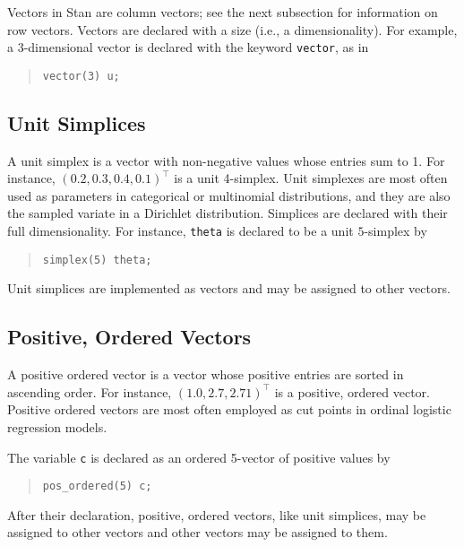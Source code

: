 \documentclass[10pt]{report}
\newcommand{\Stan}{Stan\xspace}
\newcommand{\code}[1]{{\tt #1}}
\begin{document}
Vectors in \Stan are column vectors; see the next subsection for
information on row vectors.  Vectors are declared with a size (i.e., a
dimensionality).  For example, a 3-dimensional vector is declared with
the keyword \code{vector}, as in 
%
\begin{quote}
\begin{Verbatim}
vector(3) u;
\end{Verbatim}
\end{quote}
%

\subsection{Unit Simplices}

A unit simplex is a vector with non-negative values whose entries sum
to 1.  For instance, $(0.2,0.3,0.4,0.1)^{\top}$ is a unit 4-simplex.
Unit simplexes are most often used as parameters in categorical
or multinomial distributions, and they are also the sampled variate in
a Dirichlet distribution.  Simplices are declared with their full
dimensionality.  For instance, \code{theta} is declared to
be a unit $5$-simplex by
%
\begin{quote}
\begin{Verbatim} 
simplex(5) theta;
\end{Verbatim}
\end{quote}
% 

Unit simplices are implemented as vectors and may be assigned to other
vectors.  


\subsection{Positive, Ordered Vectors}

A positive ordered vector is a vector whose positive entries are
sorted in ascending order.  For instance, $(1.0,2.7,2.71)^{\top}$ is a
positive, ordered vector.  Positive ordered vectors are most often
employed as cut points in ordinal logistic regression models.  

The variable \code{c} is declared as an ordered 5-vector of positive
values by
%
\begin{quote}
\begin{Verbatim}
pos_ordered(5) c;
\end{Verbatim}
\end{quote}
%

After their declaration, positive, ordered vectors, like unit
simplices, may be assigned to other vectors and other vectors may be
assigned to them.  
\end{document}
